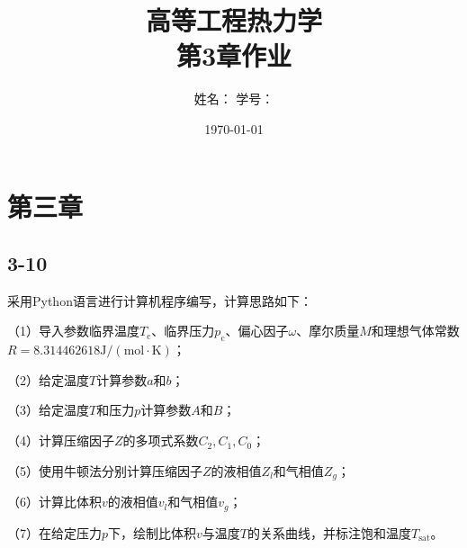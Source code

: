 \documentclass[12pt,a4paper]{article}
\title{高等工程热力学\\第3章作业}
\author{姓名：\underline{\hspace{4cm}} \quad 学号：\underline{\hspace{4cm}}}
\date{\today}
\begin{document}
\renewcommand{\maketitle}{}
\maketitle

\section*{第三章}

\subsection*{3-10}
采用Python语言进行计算机程序编写，计算思路如下：

（1）导入参数临界温度$T_\mathrm{c}$、临界压力$p_\mathrm{c}$、偏心因子$\omega$、摩尔质量$M$和理想气体常数$R=8.314462618\mathrm{J/(mol\cdot K)}$；

（2）给定温度$T$计算参数$a$和$b$；

（3）给定温度$T$和压力$p$计算参数$A$和$B$；

（4）计算压缩因子$Z$的多项式系数$C_2, C_1, C_0$；

（5）使用牛顿法分别计算压缩因子$Z$的液相值$Z_l$和气相值$Z_g$；

（6）计算比体积$v$的液相值$v_l$和气相值$v_g$；

（7）在给定压力$p$下，绘制比体积$v$与温度$T$的关系曲线，并标注饱和温度$T_\mathrm{sat}$。
\end{document}
